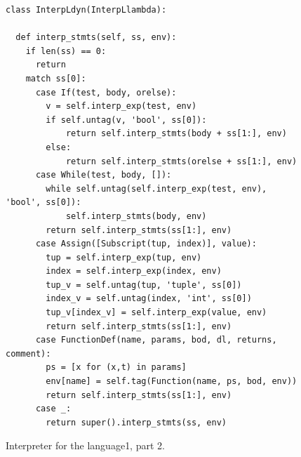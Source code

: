 \documentclass[7x10,nocrop]{TimesAPriori_MIT}%
\def\pythonEd{1}
\def\edition{0}
\newcommand{\python}[1]{{\if\edition\pythonEd #1\fi}}
\begin{document}
\begin{figure}[tbp]
\begin{lstlisting}[basicstyle=\ttfamily\footnotesize]
class InterpLdyn(InterpLlambda):
  
  def interp_stmts(self, ss, env):
    if len(ss) == 0:
      return
    match ss[0]:
      case If(test, body, orelse):
        v = self.interp_exp(test, env)
        if self.untag(v, 'bool', ss[0]):
            return self.interp_stmts(body + ss[1:], env)
        else:
            return self.interp_stmts(orelse + ss[1:], env)
      case While(test, body, []):
        while self.untag(self.interp_exp(test, env), 'bool', ss[0]):
            self.interp_stmts(body, env)
        return self.interp_stmts(ss[1:], env)
      case Assign([Subscript(tup, index)], value):
        tup = self.interp_exp(tup, env)
        index = self.interp_exp(index, env)
        tup_v = self.untag(tup, 'tuple', ss[0])
        index_v = self.untag(index, 'int', ss[0])
        tup_v[index_v] = self.interp_exp(value, env)
        return self.interp_stmts(ss[1:], env)
      case FunctionDef(name, params, bod, dl, returns, comment):
        ps = [x for (x,t) in params]
        env[name] = self.tag(Function(name, ps, bod, env))
        return self.interp_stmts(ss[1:], env)
      case _:
        return super().interp_stmts(ss, env)
\end{lstlisting}
\caption{Interpreter for the \LangDyn{} language\python{, part 2}.}
\label{fig:interp-Ldyn-2}
\end{figure}
\end{document}
